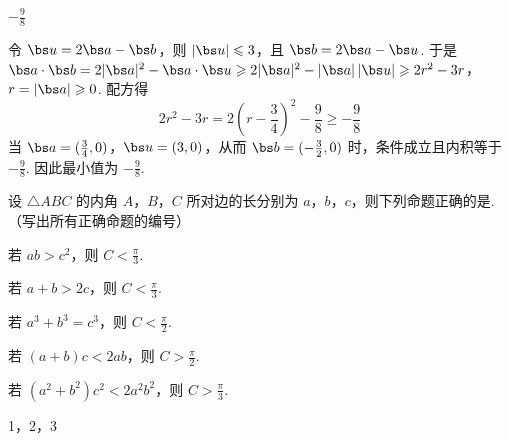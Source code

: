 \begin{answer}
\(-\frac{9}{8}\)
\end{answer}

\begin{solution}
令 \(\bs u=2\bs a-\bs b\)，则 \(|\bs u|\leqslant3\)，且 \(\bs b=2\bs a-\bs u\). 于是
\(\bs a\cdot\bs b=2|\bs a|^2-\bs a\cdot\bs u \geqslant2|\bs a|^2-|\bs a|\,|\bs u| \geqslant2r^2-3r\)，\(r=|\bs a|\geqslant0\).
配方得
\[
2r^2-3r=2\left(r-\frac34\right)^2-\frac98\geqslant-\frac98
\]
当 \(\bs a=(\frac34,0)\)，\(\bs u=(3,0)\)，从而 \(\bs b=(-\frac32,0)\) 时，条件成立且内积等于 \(-\frac98\). 因此最小值为 \(-\frac98\).
\end{solution}

\begin{problem}
设 \(\triangle ABC\) 的内角 \(A\)，\(B\)，\(C\) 所对边的长分别为 \(a\)，\(b\)，\(c\)，则下列命题正确的是\fillinblank{}. （写出所有正确命题的编号）

\begin{circlelist}
\item 若 \(ab > c^2\)，则 \(C < \frac{\pi}{3}\).
\item 若 \(a + b > 2c\)，则 \(C < \frac{\pi}{3}\).
\item 若 \(a^3 + b^3 = c^3\)，则 \(C < \frac{\pi}{2}\).
\item 若 \((a + b)c < 2ab\)，则 \(C > \frac{\pi}{2}\).
\item 若 \((a^2 + b^2)c^2 < 2a^2b^2\)，则 \(C > \frac{\pi}{3}\).
\end{circlelist}
\end{problem}

\begin{answer}
1，2，3
\end{answer}

